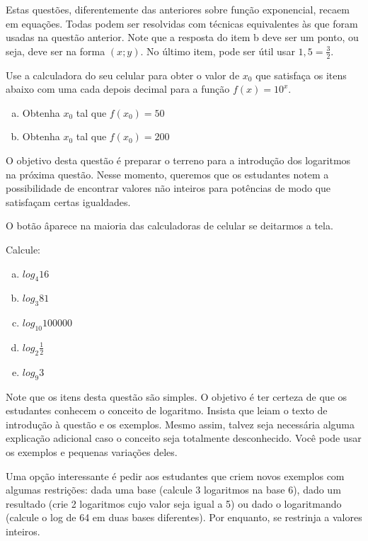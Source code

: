 \documentclass[main_estudante.tex]{subfiles}
\begin{document}
Estas questões, diferentemente das anteriores sobre função exponencial, recaem em equações. Todas podem ser resolvidas com técnicas equivalentes às que foram usadas na questão anterior. Note que a resposta do item b deve ser um ponto, ou seja, deve ser na forma $(x;y)$. No último item, pode ser útil usar $1,5=\frac{3}{2}$.

\begin{questao}
Use a calculadora do seu celular para obter o valor de $x_0$ que satisfaça os itens abaixo com uma cada depois decimal para a função $f(x)=10^x$.
\begin{enumerate}[a)]
\item Obtenha $x_0$ tal que $f(x_0)=50$
\item Obtenha $x_0$ tal que $f(x_0)=200$
\end{enumerate}
\end{questao}

O objetivo desta questão é preparar o terreno para a introdução dos logaritmos na próxima questão. Nesse momento, queremos que os estudantes notem a possibilidade de encontrar valores não inteiros para potências de modo que satisfaçam certas igualdades.

O botão \^ aparece na maioria das calculadoras de celular se deitarmos a tela.

\begin{questao}
Calcule:
\begin{enumerate}[a)]
\item $log_4 16$
\item $log_3 81$
\item $log_{10} 100000$
\item $log_2 \frac{1}{2}$
\item $log_9 3$
\end{enumerate}
\end{questao}

Note que os itens desta questão são simples. O objetivo é ter certeza de que os estudantes conhecem o conceito de logaritmo. Insista que leiam o texto de introdução à questão e os exemplos. Mesmo assim, talvez seja necessária alguma explicação adicional caso o conceito seja totalmente desconhecido. Você pode usar os exemplos e pequenas variações deles.

Uma opção interessante é pedir aos estudantes que criem novos exemplos com algumas restrições: dada uma base (calcule 3 logaritmos na base 6), dado um resultado (crie 2 logaritmos cujo valor seja igual a 5) ou dado o logaritmando (calcule o log de 64 em duas bases diferentes). Por enquanto, se restrinja a valores inteiros.
\end{document}
